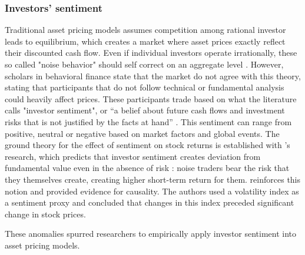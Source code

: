 \subsubsection{Investors' sentiment}


Traditional asset pricing models assumes competition among rational investor leads to equilibrium, which creates a market where asset prices exactly reflect their discounted cash flow. Even if individual investors operate irrationally, these so called "noise behavior" should self correct on an aggregate level \cite{friedman_1953}. However, scholars in behavioral finance state that the market do not agree with this theory, stating that participants that do not follow technical or fundamental analysis could heavily affect prices. These participants trade based on what the literature calls "investor sentiment", or “a belief about future cash flows and investment risks that is not justified by the facts at hand” \cite{wurgler_2007}. This sentiment can range from positive, neutral or negative based on market factors and global events. The ground theory for the effect of sentiment on stock returns is established with 's research, which predicts that investor sentiment creates deviation from fundamental value even in the absence of risk : noise traders bear the risk that they themselves create, creating higher short-term return for them.  reinforces this notion and provided evidence for causality. The authors used a volatility index as a sentiment proxy and concluded that changes in this index preceded significant change in stock prices.


These anomalies spurred researchers to empirically apply investor sentiment into asset pricing models.


